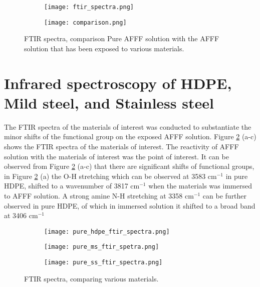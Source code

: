 \begin{figure}[H]
\centering

\begin{subfigure}{.45\textwidth}
    \texttt{[image: ftir\_spectra.png]}
    \caption{}
\end{subfigure}
\begin{subfigure}{.45\textwidth}
    \texttt{[image: comparison.png]}
    \caption{}
\end{subfigure}

\caption{FTIR spectra, comparison Pure AFFF solution with the AFFF solution that has been exposed to various materials.}
\label{ch5:figure:spectra}
\end{figure}

\section{Infrared spectroscopy of HDPE, Mild steel, and Stainless steel}  
The FTIR spectra of the materials of interest was conducted to substantiate the minor shifts of the functional group on the exposed AFFF solution. Figure \ref{ch5:figure:materials} (a-c) shows the FTIR spectra of the materials of interest. The reactivity of AFFF solution with the materials of interest was the point of interest. It can be observed from Figure \ref{ch5:figure:materials} (a-c) that there are significant shifts of functional groups, in Figure \ref{ch5:figure:materials} (a) the O-H stretching which can be observed at 3583 cm$^{-1}$ in pure HDPE, shifted to a wavenumber of 3817 cm$^{-1}$ when the materials was immersed to AFFF solution. A strong amine N-H stretching at 3358 cm$^{-1}$ can be further observed in pure HDPE, of which in immersed solution it shifted to a broad band at 3406 cm$^{-1}$

\begin{figure}[H]
\centering

\begin{subfigure}{.45\textwidth}
    \texttt{[image: pure\_hdpe\_ftir\_spectra.png]}
    \caption{}
\end{subfigure}
\begin{subfigure}{.45\textwidth}
    \texttt{[image: pure\_ms\_ftir\_spetra.png]}
    \caption{}
\end{subfigure}
\begin{subfigure}{.45\textwidth}
    \texttt{[image: pure\_ss\_ftir\_spectra.png]}
    \caption{}
\end{subfigure}

\caption{FTIR spectra, comparing various materials.}
\label{ch5:figure:materials}
\end{figure}

